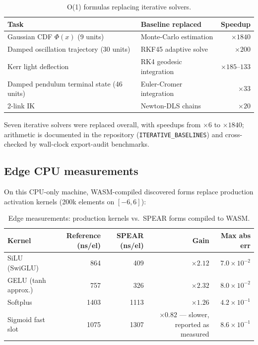 \documentclass[11pt]{article}
\begin{document}
\begin{table}[h]
\centering
\caption{O(1) formulas replacing iterative solvers.}
\label{tab:solvers}
\begin{tabular}{@{}llr@{}}
\toprule
Task & Baseline replaced & Speedup \\
\midrule
Gaussian CDF $\Phi(x)$ (9 units) & Monte-Carlo estimation & $\times1840$ \\
Damped oscillation trajectory (30 units) & RKF45 adaptive solve & $\times200$ \\
Kerr light deflection & RK4 geodesic integration & $\times185$--$133$ \\
Damped pendulum terminal state (46 units) & Euler-Cromer integration & $\times33$ \\
2-link IK & Newton-DLS chains & $\times20$ \\
\bottomrule
\end{tabular}
\end{table}

Seven iterative solvers were replaced overall, with speedups from $\times6$ to $\times1840$; arithmetic is documented in the repository (\texttt{ITERATIVE\_BASELINES}) and cross-checked by wall-clock export-audit benchmarks.

\subsection{Edge CPU measurements}
On this CPU-only machine, WASM-compiled discovered forms replace production activation kernels (200k elements on $[-6,6]$):

\begin{table}[h]
\centering
\caption{Edge measurements: production kernels vs.\ SPEAR forms compiled to WASM.}
\label{tab:edge}
\begin{tabular}{@{}lrrrr@{}}
\toprule
Kernel & Reference (ns/el) & SPEAR (ns/el) & Gain & Max abs err \\
\midrule
SiLU (SwiGLU) & 864 & 409 & $\times2.12$ & $7.0\times10^{-2}$ \\
GELU (tanh approx.) & 757 & 326 & $\times2.32$ & $8.0\times10^{-2}$ \\
Softplus & 1403 & 1113 & $\times1.26$ & $4.2\times10^{-1}$ \\
Sigmoid fast slot & 1075 & 1307 & $\times0.82$ --- slower, reported as measured & $8.6\times10^{-1}$ \\
\bottomrule
\end{tabular}
\end{table}
\end{document}
